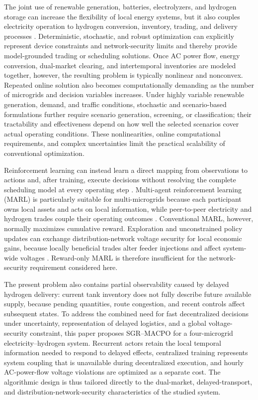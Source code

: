 \documentclass[final,5p,times]{elsarticle}
\newcommand{\method}{SGR--MACPO\xspace}
\begin{document}
The joint use of renewable generation, batteries, electrolyzers, and hydrogen storage can increase the flexibility of local energy systems, but it also couples electricity operation to hydrogen conversion, inventory, trading, and delivery processes \cite{yue2021hydrogen,staffell2019hydrogen,parra2019hydrogen,li2023hierarchical}. Deterministic, stochastic, and robust optimization can explicitly represent device constraints and network-security limits and thereby provide model-grounded trading or scheduling solutions. Once AC power flow, energy conversion, dual-market clearing, and intertemporal inventories are modeled together, however, the resulting problem is typically nonlinear and nonconvex. Repeated online solution also becomes computationally demanding as the number of microgrids and decision variables increases. Under highly variable renewable generation, demand, and traffic conditions, stochastic and scenario-based formulations further require scenario generation, screening, or classification; their tractability and effectiveness depend on how well the selected scenarios cover actual operating conditions. These nonlinearities, online computational requirements, and complex uncertainties limit the practical scalability of conventional optimization.

Reinforcement learning can instead learn a direct mapping from observations to actions and, after training, execute decisions without resolving the complete scheduling model at every operating step \cite{he2025hydrogen}. Multi-agent reinforcement learning (MARL) is particularly suitable for multi-microgrids because each participant owns local assets and acts on local information, while peer-to-peer electricity and hydrogen trades couple their operating outcomes \cite{samadi2020decentralized,fang2021multiagent,zhang2023interconnected}. Conventional MARL, however, normally maximizes cumulative reward. Exploration and unconstrained policy updates can exchange distribution-network voltage security for local economic gains, because locally beneficial trades alter feeder injections and affect system-wide voltages \cite{paudel2019p2p,tushar2020p2p,sousa2019p2p,morstyn2018p2p}. Reward-only MARL is therefore insufficient for the network-security requirement considered here.

The present problem also contains partial observability caused by delayed hydrogen delivery: current tank inventory does not fully describe future available supply, because pending quantities, route congestion, and recent controls affect subsequent states. To address the combined need for fast decentralized decisions under uncertainty, representation of delayed logistics, and a global voltage-security constraint, this paper proposes \method for a four-microgrid electricity--hydrogen system. Recurrent actors retain the local temporal information needed to respond to delayed effects, centralized training represents system coupling that is unavailable during decentralized execution, and hourly AC-power-flow voltage violations are optimized as a separate cost. The algorithmic design is thus tailored directly to the dual-market, delayed-transport, and distribution-network-security characteristics of the studied system.
\end{document}
